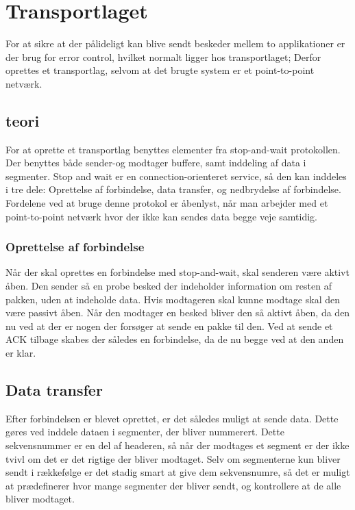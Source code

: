 \section{Transportlaget}

For at sikre at der pålideligt kan blive sendt beskeder mellem to applikationer er der brug for error control, hvilket normalt ligger hos transportlaget; Derfor oprettes et transportlag, selvom at det brugte system er et point-to-point netværk.

\subsection{teori}
For at oprette et transportlag benyttes elementer fra stop-and-wait protokollen. Der benyttes både sender-og modtager buffere, samt inddeling af data i segmenter. Stop and wait er en connection-orienteret service, så den kan inddeles i tre dele: Oprettelse af forbindelse, data transfer, og nedbrydelse af forbindelse. Fordelene ved at bruge denne protokol er åbenlyst, når man arbejder med et point-to-point netværk hvor der ikke kan sendes data begge veje samtidig.

\subsubsection{Oprettelse af forbindelse}

Når der skal oprettes en forbindelse med stop-and-wait, skal senderen være aktivt åben. Den sender så en probe besked der indeholder information om resten af pakken, uden at indeholde data. Hvis modtageren skal kunne modtage skal den være passivt åben. Når den modtager en besked bliver den så aktivt åben, da den nu ved at der er nogen der forsøger at sende en pakke til den. Ved at sende et ACK tilbage skabes der således en forbindelse, da de nu begge ved at den anden er klar.

\subsection{Data transfer}

Efter forbindelsen er blevet oprettet, er det således muligt at sende data. Dette gøres ved inddele dataen i segmenter, der bliver nummerert. Dette sekvensnummer er en del af headeren, så når der modtages et segment er der ikke tvivl om det er det rigtige der bliver modtaget. Selv om segmenterne kun bliver sendt i rækkefølge er det stadig smart at give dem sekvensnumre, så det er muligt at prædefinerer hvor mange segmenter der bliver sendt, og kontrollere at de alle bliver modtaget.

